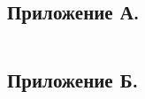 
\subsection*{Приложение А.}

\begin{verbatim}

\end{verbatim}
\newpage

\subsection*{Приложение Б.}

\begin{verbatim}
	
\end{verbatim}